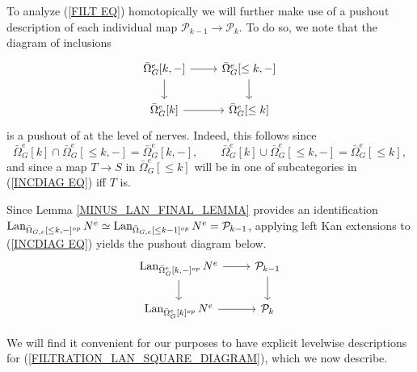 \documentclass[a4paper,10pt]{article}%
\begin{document}
To analyze (\ref{FILT EQ}) homotopically we will further make use of a pushout description of each individual map 
$\mathcal{P}_{k-1} \to \mathcal{P}_k$. To do so, we note that the diagram of inclusions
\begin{equation}\label{INCDIAG EQ}
  \begin{tikzcd}
    \bar{\Omega}_G^{e}[k,-] \arrow[d] \arrow[r] &
    \bar{\Omega}_G^{e}[\leq k,-] \arrow[d]
    \\
    \bar{\Omega}_G^e[k] \arrow[r] &
    \bar{\Omega}_G^e[\leq k]
  \end{tikzcd}
\end{equation}
is a pushout of at the level of nerves.
Indeed, this follows since
\[
\bar{\Omega}_G^e[k] \cap 
\bar{\Omega}_G^{e}[\leq k,-]
= \bar{\Omega}_G^{e}[k,-],
\qquad
\bar{\Omega}_G^e[k] \cup 
\bar{\Omega}_G^{e}[\leq k,-]
= \bar{\Omega}_G^{e}[\leq k],
\]
and since a map $T \to S$ in 
$\bar{\Omega}_G^e[\leq k]$
will be in one of subcategories in (\ref{INCDIAG EQ}) iff $T$ is.

Since Lemma \ref{MINUS_LAN_FINAL_LEMMA} provides an identification 
$\operatorname{Lan}_{\bar{\Omega}_{G,e}[\leq k,-]^{op}}N^e \simeq
\operatorname{Lan}_{\bar{\Omega}_{G,e}[\leq k-1]^{op}}N^e = \mathcal{P}_{k-1}$,
applying left Kan extensions to (\ref{INCDIAG EQ}) yields the pushout diagram below.
\begin{equation}\label{FILTRATION_LAN_SQUARE_DIAGRAM}
  \begin{tikzcd}
    \Lan_{\bar{\Omega}_{G}^e[k,-]^{op}}N^e \arrow[d] \arrow[r] & 
    \P_{k-1} \arrow[d]
    \\
    \Lan_{\bar{\Omega}_{G}^e[k]^{op}}N^e \arrow[r] &
    \P_k
  \end{tikzcd}
\end{equation}

We will find it convenient for our purposes to 
have explicit levelwise descriptions for 
(\ref{FILTRATION_LAN_SQUARE_DIAGRAM}),
which we now describe.



\end{document}
